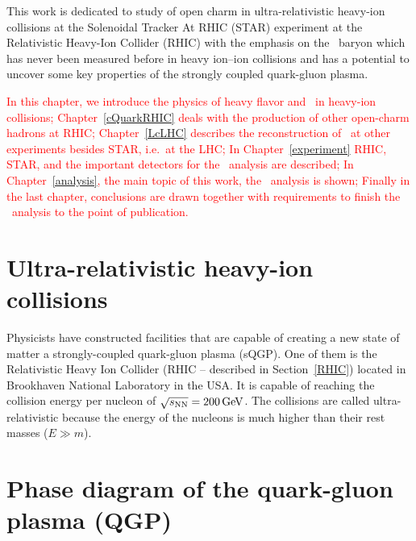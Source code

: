 This work is dedicated to study of open charm in ultra-relativistic heavy-ion collisions at the Solenoidal Tracker At RHIC (STAR) experiment at the Relativistic Heavy-Ion Collider (RHIC) with the emphasis on the \Lambdac\ baryon which has never been measured before in heavy ion--ion collisions and has a potential to uncover some key properties of the strongly coupled quark-gluon plasma.

\textcolor{red}{In this chapter, we introduce the physics of heavy flavor and \Lambdac\ in heavy-ion collisions; Chapter~\ref{cQuarkRHIC} deals with the production of other open-charm hadrons at RHIC\@; Chapter~\ref{LcLHC} describes the reconstruction of \Lambdac\ at other experiments besides STAR, i.e.\ at the LHC\@; In Chapter~\ref{experiment} RHIC, STAR, and the important detectors for the \Lambdac\ analysis are described; In Chapter~\ref{analysis}, the main topic of this work, the \Lambdac\ analysis is shown; Finally in the last chapter, conclusions are drawn together with requirements to finish the \Lambdac\ analysis to the point of publication.}

\section{Ultra-relativistic heavy-ion collisions}

Physicists have constructed facilities that are capable of creating a new state of matter a strongly-coupled quark-gluon plasma (sQGP). One of them is the Relativistic Heavy Ion Collider (RHIC -- described in Section~\ref{RHIC}) located in Brookhaven National Laboratory in the USA\@. It is capable of reaching the collision energy per nucleon of $\sqrt{s_\text{NN}}= \SI{200}{\giga\electronvolt}$. The collisions are called ultra-relativistic because the energy of the nucleons is much higher than their rest masses ($E \gg m$).

\section{Phase diagram of the quark-gluon plasma (QGP)}


